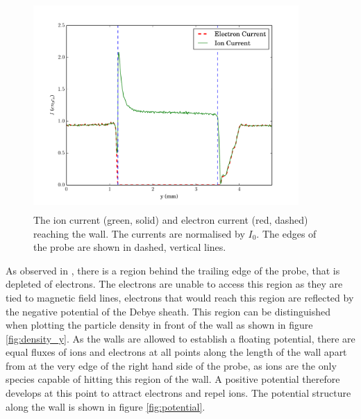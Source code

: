 \begin{figure}[H]
	\centering
	\includegraphics[width=0.9\textwidth, height = 8cm]{both_fluxes_150V.pdf}
	\caption{The ion current (green, solid) and electron current (red, dashed) reaching the wall. The currents are normalised by $I_0$. The edges of the probe are shown in dashed, vertical lines.  }
	\label{fig:fluxes}
\end{figure}
As observed in \cite{bergmann_1994}, there is a region behind the trailing edge of the probe, that is depleted of electrons. The electrons are unable to access this region as they are tied to magnetic field lines, electrons that would reach this region are reflected by the negative potential of the Debye sheath. This region can be distinguished when plotting the particle density in front of the wall as shown in figure \ref{fig:density_y}. As the walls are allowed to establish a floating potential, there are equal fluxes of ions and electrons at all points along the length of the wall apart from at the very edge of the right hand side of the probe, as ions are the only species capable of hitting this region of the wall. A positive potential therefore develops at this point to attract electrons and repel ions. The potential structure along the wall is shown in figure \ref{fig:potential}.

